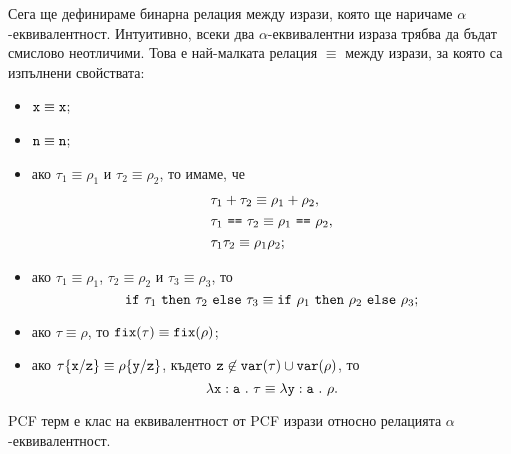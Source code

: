 Сега ще дефинираме бинарна релация между изрази, която ще наричаме $\alpha$-еквивалентност.
Интуитивно, всеки два $\alpha$-еквивалентни израза трябва да бъдат смислово неотличими.
Това е най-малката релация $\equiv$ между изрази, за която са изпълнени свойствата:
\begin{itemize}
\item
  $\texttt{x} \equiv \texttt{x}$;
\item
  $\texttt{n} \equiv \texttt{n}$;
\item
  ако $\tau_1 \equiv \rho_1$ и $\tau_2 \equiv \rho_2$, то имаме, че
  \begin{align*}
    & \tau_1 + \tau_2 \equiv \rho_1 + \rho_2,\\
    & \tau_1\ \texttt{==}\ \tau_2 \equiv \rho_1\ \texttt{==}\ \rho_2,\\
    & \tau_1 \tau_2 \equiv \rho_1 \rho_2;
  \end{align*}
\item
  ако $\tau_1 \equiv \rho_1$, $\tau_2 \equiv \rho_2$ и $\tau_3 \equiv \rho_3$, то
  \[\texttt{if}\ \tau_1\ \texttt{then}\ \tau_2\ \texttt{else}\ \tau_3 \equiv \texttt{if}\ \rho_1\ \texttt{then}\ \rho_2\ \texttt{else}\ \rho_3;\]
\item
  ако $\tau \equiv \rho$, то $\texttt{fix}(\tau) \equiv \texttt{fix}(\rho)$;
\item
  
  ако $\tau\{\texttt{x}/{\texttt{z}}\} \equiv \rho\{\texttt{y}/{\texttt{z}}\}$, където $\texttt{z} \not\in \texttt{var}(\tau) \cup \texttt{var}(\rho)$, то
  \[\lambda\texttt{x}:\texttt{a}\ .\ {\tau} \equiv \lambda\texttt{y}:\texttt{a}\ .\ {\rho}.\]
\end{itemize}
\begin{framed}
  PCF терм е клас на еквивалентност от PCF изрази относно релацията $\alpha$-еквивалентност.
\end{framed}

